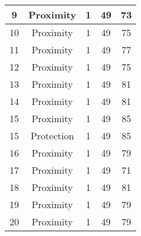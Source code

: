 \documentclass[results.tex]{subfiles}
\begin{document}
\begin{center}
\begin{tabular}{| c || c | c | c | c |}
            \hline
            9                       & Proximity                    & 1                      & 49                      & 73                   \\
            \hline
            10                      & Proximity                    & 1                      & 49                      & 75                   \\
            \hline
            11                      & Proximity                    & 1                      & 49                      & 77                   \\
            \hline
            12                      & Proximity                    & 1                      & 49                      & 75                   \\
            \hline
            13                      & Proximity                    & 1                      & 49                      & 81                   \\
            \hline
            14                      & Proximity                    & 1                      & 49                      & 81                   \\
            \hline
            15                      & Proximity                    & 1                      & 49                      & 85                   \\
            \hline
            15                      & Protection                   & 1                      & 49                      & 85                   \\
            \hline
            16                      & Proximity                    & 1                      & 49                      & 79                   \\
            \hline
            17                      & Proximity                    & 1                      & 49                      & 71                   \\
            \hline
            18                      & Proximity                    & 1                      & 49                      & 81                   \\
            \hline
            19                      & Proximity                    & 1                      & 49                      & 79                   \\
            \hline
            20                      & Proximity                    & 1                      & 49                      & 79                   \\

\end{tabular}
\end{center}
\end{document}
